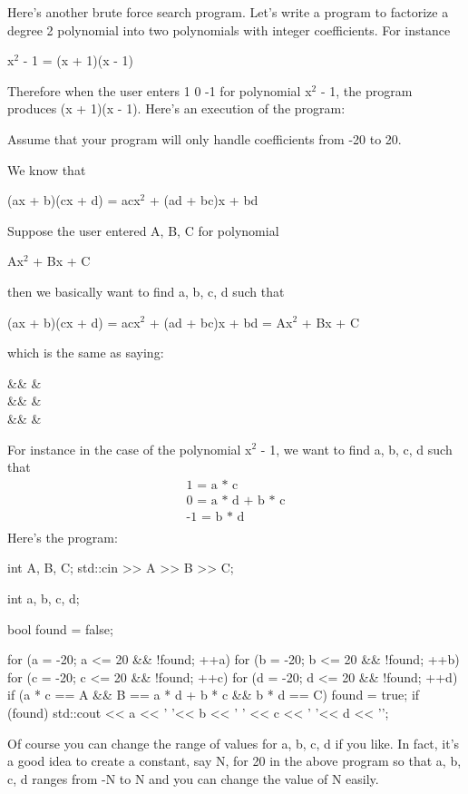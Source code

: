 \begin{console}
Here's another brute force search program.
Let's write a program to factorize a degree 2 polynomial
into two polynomials with integer coefficients. For instance
\begin{center}
x$^2$ - 1 = (x + 1)(x - 1)
\end{center}
Therefore when the user enters 1 0 -1 for polynomial
x$^2$ - 1, the program produces (x + 1)(x - 1).
Here's an execution of the program:
Assume that your program will only handle coefficients from -20 to 20.

We know that
\begin{center}
(ax + b)(cx + d) = acx$^2$ + (ad + bc)x + bd
\end{center}
Suppose the user entered A, B, C for polynomial
\begin{center}
Ax$^2$ + Bx + C
\end{center}
then we basically want to find a, b, c, d such that
\begin{center}
(ax + b)(cx + d) = acx$^2$ + (ad + bc)x + bd = Ax$^2$ + Bx + C
\end{center}
which is the same as saying:
\begin{flalign*}
&& &\\
&& &\\
&& &\\
\end{flalign*}
For instance in the case of the polynomial x$^{2}$ - 1, we
want to find a, b, c, d such that
\begin{align*}
\text{1 = a * c}\\
\text{0 = a * d + b * c}\\
\text{-1 = b * d}\\
\end{align*}
Here's the program:
\begin{console}
int A, B, C;
std::cin >> A >> B >> C;

int a, b, c, d;

bool found = false;

for (a = -20; a <= 20 && !found; ++a)
{   
    for (b = -20; b <= 20 && !found; ++b)
    {   
        for (c = -20; c <= 20 && !found; ++c)
        {
        for (d = -20; d <= 20 && !found; ++d)
        {
            if (a * c == A
                 && B == a * d + b * c
                 && b * d == C)
            {  
                    found = true;
            }
        }
     }
}
if (found)
{  
   std::cout << a << ' '<< b
             << ' ' << c << ' '<< d << '\n';
}
}
\end{console}
Of course you can change the range of values for a, b, c, d if you like.
In fact, it's a good idea to create a constant, say N,
for 20 in the above program so that a, b, c, d ranges from -N to N and
you can change the value of N easily.


\end{console}
